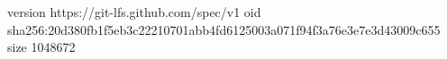 version https://git-lfs.github.com/spec/v1
oid sha256:20d380fb1f5eb3c22210701abb4fd6125003a071f94f3a76e3e7e3d43009c655
size 1048672
